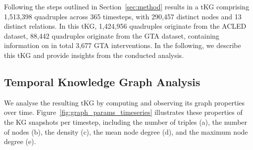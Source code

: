 Following the steps outlined in Section~\ref{sec:method} results in a tKG comprising 1,513,398 quadruples across 365 timesteps, with 290,457 distinct nodes and 13 distinct relations. In this tKG, 1,424,956 quadruples originate from the ACLED dataset, 88,442 quadruples originate from the GTA dataset, containing information on in total 3,677 GTA interventions. In the following, we describe this tKG and provide insights from the conducted analysis.

\subsection{Temporal Knowledge Graph Analysis} 
We analyse the resulting tKG by computing and observing its graph properties over time. Figure~\ref{fig:graph_params_timeseries} illustrates these properties of the KG snapshots per timestep, including the number of triples (a), the number of nodes (b), the density (c), the mean node degree (d), and the maximum node degree (e). 
